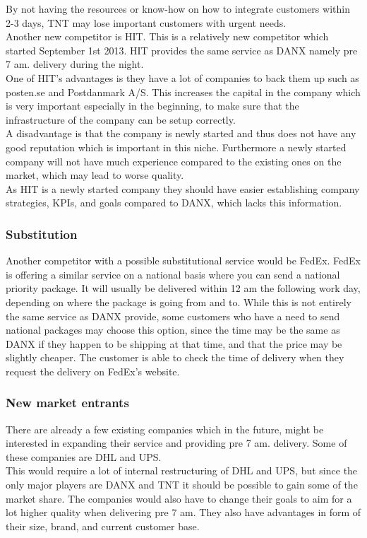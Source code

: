By not having the resources or know-how on how to integrate customers within 2-3 days, TNT may lose important customers with urgent needs.\\
Another new competitor is HIT\cite{malene001}\cite{webpage002}. This is a relatively new competitor which started September 1st 2013\cite{webpage003}. HIT provides the same service as DANX namely pre 7 am. delivery during the night.\\
One of HIT’s advantages is they have a lot of companies to back them up such as posten.se and Postdanmark A/S. This increases the capital in the company which is very important especially in the beginning, to make sure that the infrastructure of the company can be setup correctly.\\
A disadvantage is that the company is newly started and thus does not have any good reputation which is important in this niche. Furthermore a newly started company will not have much experience compared to the existing ones on the market, which may lead to worse quality.\\
As HIT is a newly started company they should have easier establishing company strategies, KPIs, and goals compared to DANX, which lacks this information.  

\subsubsection{Substitution}
Another competitor with a possible substitutional service would be FedEx\cite{webpage004}. FedEx is offering a similar service on a national basis where you can send a national priority package. It will usually be delivered within 12 am the following work day, depending on where the package is going from and to. While this is not entirely the same service as DANX provide, some customers who have a need to send national packages may choose this option, since the time may be the same as DANX if they happen to be shipping at that time, and that the price may be slightly cheaper. The customer is able to check the time of delivery when they request the delivery on FedEx’s website.

\subsubsection{New market entrants}
There are already a few existing companies which in the future, might be interested in expanding their service and providing pre 7 am. delivery. Some of these companies are DHL and UPS.\\
This would require a lot of internal restructuring of DHL and UPS, but since the only major players are DANX and TNT it should be possible to gain some of the market share. The companies would also have to change their goals to aim for a lot higher quality when delivering pre 7 am. They also have advantages in form of their size, brand, and current customer base.

